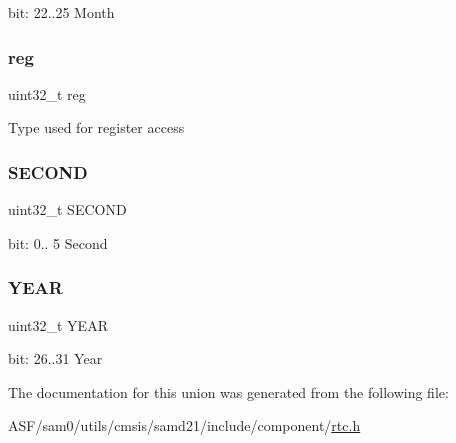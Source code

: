 bit\+: 22..25 Month \mbox{\label{union_r_t_c___m_o_d_e2___c_l_o_c_k___type_a6b91636401516a477989a336376d7b40}} 
\subsubsection{\texorpdfstring{reg}{reg}}
{\footnotesize\ttfamily uint32\+\_\+t reg}

Type used for register access \mbox{\label{union_r_t_c___m_o_d_e2___c_l_o_c_k___type_a3c1af5a31c00cc624e89e3f26e47c069}} 
\subsubsection{\texorpdfstring{SECOND}{SECOND}}
{\footnotesize\ttfamily uint32\+\_\+t S\+E\+C\+O\+ND}

bit\+: 0.. 5 Second \mbox{\label{union_r_t_c___m_o_d_e2___c_l_o_c_k___type_ada0131b43bb6b8e77fb3afbe4e25e4d4}} 
\subsubsection{\texorpdfstring{YEAR}{YEAR}}
{\footnotesize\ttfamily uint32\+\_\+t Y\+E\+AR}

bit\+: 26..31 Year 

The documentation for this union was generated from the following file\+:\begin{DoxyCompactItemize}
\item 
A\+S\+F/sam0/utils/cmsis/samd21/include/component/\mbox{\hyperlink{component_2rtc_8h}{rtc.\+h}}\end{DoxyCompactItemize}
